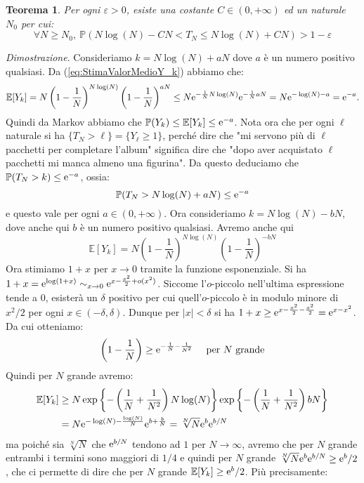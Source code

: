 \documentclass[11pt]{book}
\makeatletter
\theoremstyle{Definizione}
\theoremstyle{TeoremaProposizioneLemmaCorollario}
\newtheorem{myteo}{Teorema}[section]
\theoremstyle{OsservazioneNota}
\renewenvironment{proof}[1][\proofname]{\par
  \normalfont \topsep6\p@\@plus6\p@\relax
  \trivlist
  \item[\hskip\labelsep
        \itshape
    #1\@addpunct{.}]\ignorespaces
}{%
  \endtrivlist\@endpefalse
}
\renewcommand{\P}{\mathbb{P}}
\newcommand{\e}{\textup{e}}
\newcommand{\E}{\mathbb{E}}
\renewenvironment{proof}{\textsl{Dimostrazione}.}{}
\makeatother
\begin{document}
\begin{boxteo}{}
\begin{myteo}
Per ogni $\varepsilon > 0$, esiste una costante $C \in (0,+\infty)$ ed un naturale $N_0$ per cui:
$$
\forall N \geq N_0,\ \P(N \log(N)-CN < T_N \leq N\log(N)+CN) > 1-\varepsilon
$$
\end{myteo}
\tcblower
\begin{proof}
Consideriamo $k = N \log(N)+ a N$ dove $a$ è un numero positivo qualsiasi. Da (\ref{eq:StimaValorMedioY_k}) abbiamo che:
$$
\E[Y_{k}] = N \left(1-\frac{1}{N}\right)^{N\log(N)}\left(1-\frac{1}{N}\right)^{aN} \leq N \e^{-\frac{1}{N}N\log(N)}\e^{-\frac{1}{N}aN} = N \e^{-\log(N)-a} = \e^{-a}.
$$
Quindi da Markov abbiamo che $\P(Y_{k}) \leq \E[Y_{k}] \leq \e^{-a}$. Nota ora che per ogni $\ell$ naturale si ha $\{T_N > \ell\} = \{Y_\ell \geq 1\}$, perché dire che "mi servono più di $\ell$ pacchetti per completare l'album" significa dire che "dopo aver acquistato $\ell$ pacchetti mi manca almeno una figurina". Da questo deduciamo che $\P(T_N > k) \leq \e^{-a}$, ossia:
\begin{equation}\label{eq:teo:TeoremaCouponCollectorStimaT_N1}
\P(T_N > N\log(N)+ a N) \leq \e^{-a}
\end{equation}
e questo vale per ogni $a\in (0,+\infty)$. Ora consideriamo $k = N \log(N)-bN$, dove anche qui $b$ è un numero positivo qualsiasi. Avremo anche qui
$$
\E[Y_k] =  N \left(1-\frac{1}{N}\right)^{N\log(N)}\left(1-\frac{1}{N}\right)^{-bN}
$$
Ora stimiamo $1+x$ per $x \to 0$ tramite la funzione esponenziale. Si ha $1+x = \e^{\log(1+x)} \sim_{x\to 0} \e^{x-\frac{x^2}{2}+o(x^2)}$. Siccome l'$o$-piccolo nell'ultima espressione tende a $0$, esisterà un $\delta$ positivo per cui quell'$o$-piccolo è in modulo minore di $x^2/2$ per ogni $x\in (-\delta, \delta)$. Dunque per $|x| < \delta$ si ha $1+x \geq \e^{x-\frac{x^2}{2}-\frac{x^2}{2}} = \e^{x-x^2}$. Da cui otteniamo:
$$
\left(1-\frac{1}{N}\right) \geq \e^{-\frac{1}{N}-\frac{1}{N^2}}\quad \textup{ per }N\textup{ grande}
$$
Quindi per $N$ grande avremo:
\begin{align*}
\E[Y_k] &\geq N \exp\left\{-\left(\frac{1}{N}+\frac{1}{N^2}\right)N\log(N)\right\}\exp\left\{-\left(\frac{1}{N}+\frac{1}{N^2}\right)bN\right\}\\
&= N \e^{-\log(N)-\frac{\log(N)}{N}} \e^{b+\frac{b}{N}} = \sqrt[N]{N}\e^{b}\e^{b/N}
\end{align*}
ma poiché sia $\sqrt[N]{N}$ che $\e^{b/N}$ tendono ad $1$ per $N \to \infty$, avremo che per $N$ grande entrambi i termini sono maggiori di $1/4$ e quindi per $N$ grande $\sqrt[N]{N}\e^{b}\e^{b/N} \geq \e^{b}/2$, che ci permette di dire che per $N$ grande $\E[Y_k] \geq \e^{b}/2$. Più precisamente:

\end{proof}
\end{boxteo}
\end{document}

